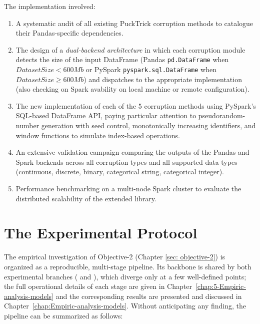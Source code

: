 \documentclass[../main.tex]{subfiles}
\begin{document}
The implementation involved:
\begin{enumerate}
    \item A systematic audit of all existing PuckTrick corruption methods to catalogue their Pandas-specific dependencies.
    \item The design of a \emph{dual-backend architecture} in which each corruption module detects the size of the input DataFrame (Pandas \texttt{pd.DataFrame} when $DatasetSize < 600 Mb$ or PySpark \texttt{pyspark.sql.DataFrame} when $DatasetSize \ge 600 Mb$) and dispatches to the appropriate implementation (also checking on Spark avability on local machine or remote configuration).
    \item The new implementation of each of the 5 corruption methods using PySpark's SQL-based DataFrame API, paying particular attention to pseudorandom-number generation with seed control, monotonically increasing identifiers, and window functions to simulate index-based operations.
    \item An extensive validation campaign comparing the outputs of the Pandas and Spark backends across all corruption types and all supported data types (continuous, discrete, binary, categorical string, categorical integer).
    \item Performance benchmarking on a multi-node Spark cluster to evaluate the distributed scalability of the extended library.
\end{enumerate}

\newpage
\vspace*{-6em}
\section{The Experimental Protocol}

The empirical investigation of Objective-2 (Chapter \ref{sec: objective-2}) is organized as a reproducible, multi-stage pipeline. Its backbone is shared by both experimental branches ( and ), which diverge only at a few well-defined points; the full operational details of each stage are given in Chapter~\ref{chap:5-Empiric-analysis-models} and the corresponding results are presented and discussed in Chapter~\ref{chap:Empiric-analysis-models}. Without anticipating any finding, the pipeline can be summarized as follows:
\end{document}
